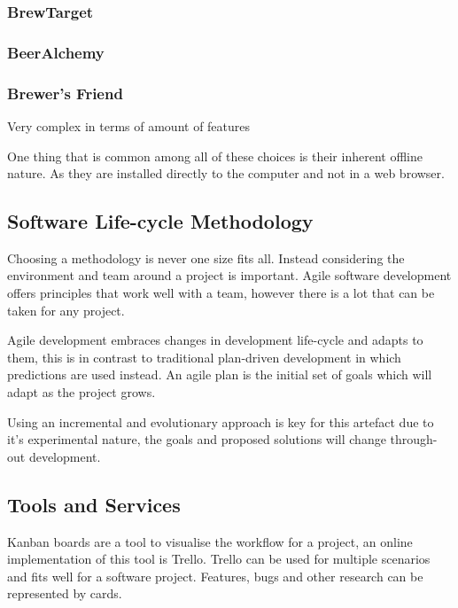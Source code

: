 \subsubsection{BrewTarget}
\subsubsection{BeerAlchemy}
\subsubsection{Brewer's Friend}


Very complex in terms of amount of features

One thing that is common among all of these choices is their inherent offline nature. As they are installed directly to the computer and not in a web browser.

\subsection{Software Life-cycle Methodology} \label{a-d--methodology--life-cycle}

Choosing a methodology is never one size fits all. Instead considering the environment and team around a project is important. Agile software development offers principles that work well with a team, however there is a lot that can be taken for any project.

Agile development embraces changes in development life-cycle and adapts to them, this is in contrast to traditional plan-driven development in which predictions are used instead. An agile plan is the initial set of goals which will adapt as the project grows. \cite{fowler_agile}

Using an incremental and evolutionary approach is key for this artefact due to it's experimental nature, the goals and proposed solutions will change through-out development.

\subsection{Tools and Services} \label{a-d--methodology--tools}

Kanban boards are a tool to visualise the workflow for a project, an online implementation of this tool is Trello. Trello can be used for multiple scenarios and fits well for a software project. Features, bugs and other research can be represented by cards. \cite{trello} %

